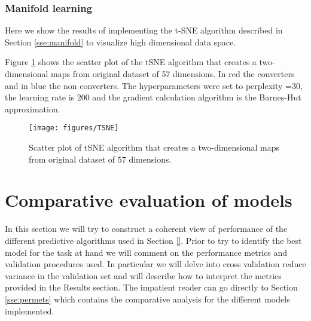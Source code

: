 \documentclass[11pt]{article}
\theoremstyle{definition}
\theoremstyle{remark}
\begin{document}
\subsubsection{Manifold learning}
\label{sse:resmanifold}
Here we show the results of implementing the t-SNE algorithm described in Section \ref{sse:manifold} to visualize high dimensional data space.


Figure \ref{fig:TSNE} shows the scatter plot of the tSNE algorithm that creates a two-dimensional maps from original dataset of 57 dimensions. In red the converters and in blue the non converters. The hyperparameters were set to perplexity =30, the learning rate is 200 and the  gradient calculation algorithm is the Barnes-Hut approximation.

\begin{figure}[H] 
        \centering
        \texttt{[image: figures/TSNE]}
        \caption{Scatter plot of tSNE algorithm that creates a two-dimensional maps from original dataset of 57 dimensions. 
        } \label{fig:TSNE}
\end{figure}


\section{Comparative evaluation of models}
\label{se:compare}
In this section we will try to construct a coherent view of performance of the different predictive algorithms used in Section \ref{}.
Prior to try to identify the best model for the task at hand we will comment on the performance metrics and validation procedures used. In particular we will delve into cross validation reduce variance in the validation set and will describe how to interpret the metrics provided in the Results section. The impatient reader can go directly to Section \ref{sse:permets} which contains the comparative analysis for the different models implemented.
\end{document}
